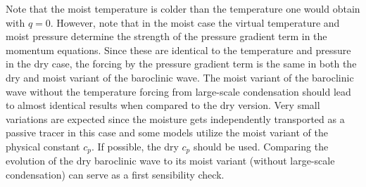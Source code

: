 \documentclass[times,doublespace]{fldauth}
\begin{document}
Note that the moist temperature is colder than the temperature one would obtain with $q = 0$. However, note that in the moist case the virtual temperature and moist pressure determine the strength of the pressure gradient term in the momentum equations. Since these are identical to the temperature and pressure in the dry case, the forcing by the pressure gradient term is the same in both the dry and moist variant of the baroclinic wave. The moist variant of the baroclinic wave without the temperature forcing from large-scale condensation should lead to almost identical results when compared to the dry version. Very small variations are expected since the moisture gets independently transported as a passive tracer in this case and some models utilize the moist variant of the physical constant $c_p$. If possible, the dry $c_p$ should be used. Comparing the evolution of the dry baroclinic wave to its moist variant (without large-scale condensation) can serve as a first sensibility check.
\end{document}
